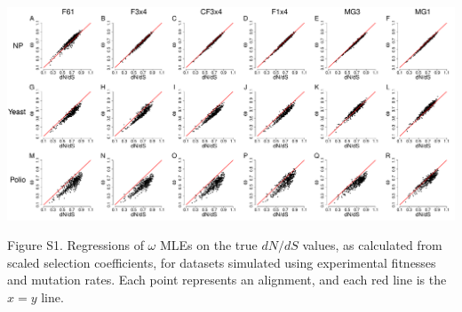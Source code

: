 \documentclass[11pt]{article}
\begin{document}
\newpage

\begin{landscape}
	\includegraphics[width=9.5in]{figures/SI/nyp_regression.pdf}
	\vspace{0.5cm}
	
	Figure S1. Regressions of $\omega$ MLEs on the true $dN/dS$ values, as calculated from scaled selection coefficients, for datasets simulated using experimental fitnesses and mutation rates. Each point represents an alignment, and each red line is the $x=y$ line.
\end{landscape}
\end{document}
